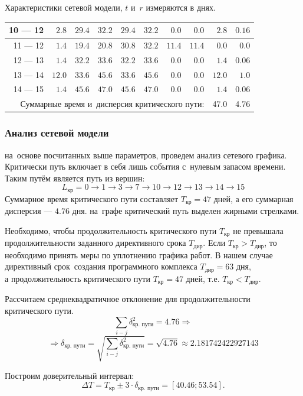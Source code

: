 \begin{dsmalltable}{Характеристики сетевой модели, $t$ и~$r$ измеряются в днях.}
\begin{tabular}{|r|r||r|r||r|r||r|r||r|r|}
			\hline 10 --- 12&$ 2.8$&$29.4$&$32.2$&$29.4$&$32.2$&$ 0.0$&$ 0.0 $&$ 2.8$&$0.16$\\
			\hline 11 --- 12&$ 1.4$&$19.4$&$20.8$&$30.8$&$32.2$&$11.4$&$11.4 $&$ 0.0$&$0.0 $\\
			\hline 12 --- 13&$ 1.4$&$32.2$&$33.6$&$32.2$&$33.6$&$ 0.0$&$ 0.0 $&$ 1.4$&$0.06$\\
			\hline 13 --- 14&$12.0$&$33.6$&$45.6$&$33.6$&$45.6$&$ 0.0$&$ 0.0 $&$12.0$&$1.0 $\\
			\hline 14 --- 15&$ 1.4$&$45.6$&$47.0$&$45.6$&$47.0$&$ 0.0$&$ 0.0 $&$ 1.4$&$0.06$\\
		\hline	\multicolumn{8}{|r||}{Суммарные время и~дисперсия критического пути:}   &   47.0 &  4.76 \\
		\hline
	\end{tabular} 
\end{dsmalltable}

	
\subsubsection{Анализ сетевой модели}

на~основе посчитанных выше параметров, проведем анализ сетевого
графика. Критически путь включает в себя лишь события с~нулевым запасом времени.
Таким путём является путь из вершин: 
\[
	L_\text{кр} = 0 \rightarrow 1 \rightarrow 3  \rightarrow 7 \rightarrow 10 \rightarrow 12 \rightarrow 13  \rightarrow 14 \rightarrow 15
\]
Суммарное время критического пути составляет $T_\text{кр} = 47$  дней, а его
суммарная дисперсия — $4.76$ дня. 
на~графе критический путь выделен жирными стрелками.

Необходимо, чтобы продолжительность критического пути $T_\text{кр}$
не превышала продолжительности заданного директивного срока $ T_\text{дир}$. 
Если $T_\text{кр} > T_\text{дир}$, то необходимо принять меры по уплотнению графика работ.
В нашем случае директивный срок~создания программного комплекса $T_\text{дир} =63$ дня,\\ 
а продолжительность критического пути $T_\text{кр} = 47$  дней, т.е. $T_\text{кр} < T_\text{дир}$.

Рассчитаем среднеквадратичное отклонение для продолжительности \\
критического пути. 
\[
	\sum\limits_{i-j} \delta^2_{\text{кр. пути}} = 4.76 \Rightarrow  
\]\[
	\Rightarrow  \delta_{\text{кр. пути}} = \sqrt{\sum\limits_{i-j} \delta^2_{\text{кр. пути}}} = \sqrt{4.76} \approx 2.181742422927143
\]

Построим доверительный интервал: 
\[
	\Delta T = T_\text{кр} \pm 3 \cdot \delta_{\text{кр. пути}} = \left[ 40.46; 53.54 \right].
\]

